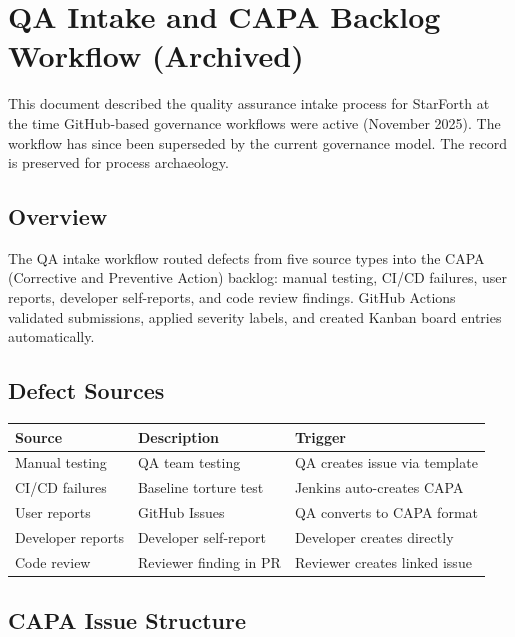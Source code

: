 
\section{QA Intake and CAPA Backlog Workflow (Archived)}

This document described the quality assurance intake process for StarForth
at the time GitHub-based governance workflows were active (November 2025).
The workflow has since been superseded by the current governance model.
The record is preserved for process archaeology.

\subsection{Overview}

The QA intake workflow routed defects from five source types into the CAPA
(Corrective and Preventive Action) backlog:
manual testing, CI/CD failures, user reports, developer self-reports, and
code review findings. GitHub Actions validated submissions, applied severity
labels, and created Kanban board entries automatically.

\subsection{Defect Sources}

\begin{center}
\begin{tabular}{lll}
\toprule
Source & Description & Trigger \\
\midrule
Manual testing    & QA team testing          & QA creates issue via template \\
CI/CD failures    & Baseline torture test    & Jenkins auto-creates CAPA \\
User reports      & GitHub Issues            & QA converts to CAPA format \\
Developer reports & Developer self-report    & Developer creates directly \\
Code review       & Reviewer finding in PR   & Reviewer creates linked issue \\
\bottomrule
\end{tabular}
\end{center}

\subsection{CAPA Issue Structure}

